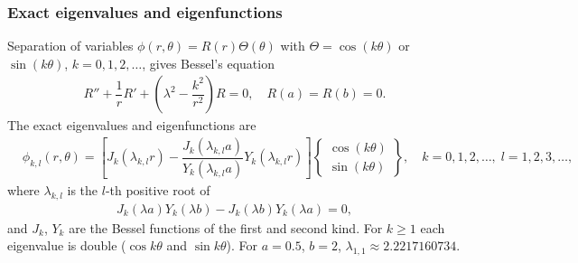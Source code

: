 \documentclass[11pt]{article}
\begin{document}
\subsubsection{Exact eigenvalues and eigenfunctions}
\label{sec:AnnulusExactEigen}
Separation of variables $\phi(r,\theta)=R(r)\Theta(\theta)$ with $\Theta=\cos(k\theta)$ or $\sin(k\theta)$, $k=0,1,2,\dots$, gives Bessel's equation
\begin{align}
R''+\dfrac{1}{r}R'+\left(\lambda^2-\dfrac{k^2}{r^2}\right)R=0, \quad R(a)=R(b)=0.
\end{align}
The exact eigenvalues and eigenfunctions are
\begin{subequations}
\begin{align}
&\phi_{k,l}(r,\theta) = \left[J_k(\lambda_{k,l} r)-\dfrac{J_k(\lambda_{k,l} a)}{Y_k(\lambda_{k,l} a)}Y_k(\lambda_{k,l} r)\right]\begin{Bmatrix}\cos(k\theta)\\ \sin(k\theta)\end{Bmatrix}, \quad k=0,1,2,\dots,\; l=1,2,3,\dots,
\end{align}
\end{subequations}
where $\lambda_{k,l}$ is the $l$-th positive root of
\begin{align}
J_k(\lambda a)Y_k(\lambda b)-J_k(\lambda b)Y_k(\lambda a)=0,
\end{align}
and $J_k$, $Y_k$ are the Bessel functions of the first and second kind. For $k\geq 1$ each eigenvalue is double ($\cos k\theta$ and $\sin k\theta$). For $a=0.5$, $b=2$, $\lambda_{1,1}\approx 2.2217160734$.
\end{document}

